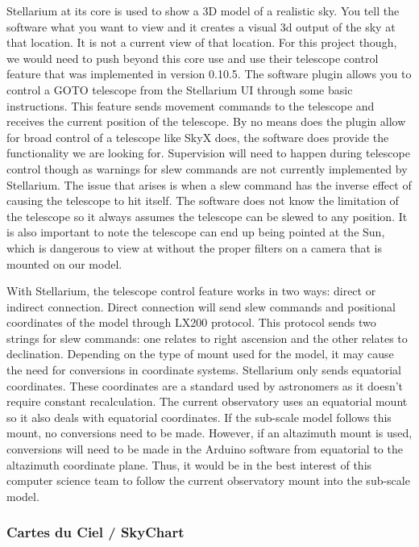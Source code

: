 \documentclass[12pt]{article}
\begin{document}
Stellarium at its core is used to show a 3D model of a realistic sky. You tell the software what you want to view and it creates a visual 3d output of the sky at that location. It is not a current view of that location. For this project though, we would need to push beyond this core use and use their telescope control feature that was implemented in version 0.10.5. The software plugin allows you to control a GOTO telescope from the Stellarium UI through some basic instructions. This feature sends movement commands to the telescope and receives the current position of the telescope. By no means does the plugin allow for broad control of a telescope like SkyX does, the software does provide the functionality we are looking for. Supervision will need to happen during telescope control though as warnings for slew commands are not currently implemented by Stellarium. The issue that arises is when a slew command has the inverse effect of causing the telescope to hit itself. The software does not know the limitation of the telescope so it always assumes the telescope can be slewed to any position. It is also important to note the telescope can end up being pointed at the Sun, which is dangerous to view at without the proper filters on a camera that is mounted on our model.

With Stellarium, the telescope control feature works in two ways: direct or indirect connection. Direct connection will send slew commands and positional coordinates of the model through LX200 protocol. This protocol sends two strings for slew commands: one relates to right ascension and the other relates to declination. Depending on the type of mount used for the model, it may cause the need for conversions in coordinate systems. Stellarium only sends equatorial coordinates. These coordinates are a standard used by astronomers as it doesn't require constant recalculation. The current observatory uses an equatorial mount so it also deals with equatorial coordinates. If the sub-scale model follows this mount, no conversions need to be made. However, if an altazimuth mount is used, conversions will need to be made in the Arduino software from equatorial to the altazimuth coordinate plane. Thus, it would be in the best interest of this computer science team to follow the current observatory mount into the sub-scale model.

\subsubsection{Cartes du Ciel / SkyChart}
\end{document}
